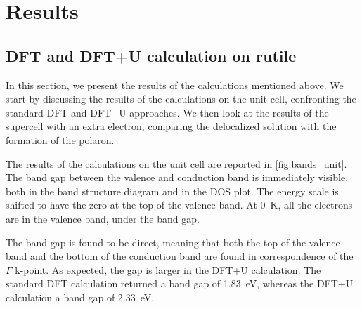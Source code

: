 \section{Results}
\subsection{DFT and DFT+U calculation on rutile}
In this section, we present the results of the calculations mentioned above. We start by discussing the results of the calculations on the unit cell, confronting the standard DFT and DFT+U approaches. We then look at the results of the supercell with an extra electron, comparing the delocalized solution with the formation of the polaron.

The results of the calculations on the unit cell are reported in \cref{fig:bands_unit}. The band gap between the valence and conduction band is immediately visible, both in the band structure diagram and in the DOS plot. The energy scale is shifted to have the zero at the top of the valence band. At \SI{0}{\kelvin}, all the electrons are in the valence band, under the band gap.

The band gap is found to be direct, meaning that both the top of the valence band and the bottom of the conduction band are found in correspondence of the $\Gamma$ k-point. As expected, the gap is larger in the DFT+U calculation. The standard DFT calculation returned a band gap of \SI{1.83}{eV}, whereas the DFT+U calculation a band gap of \SI{2.33}{eV}.

